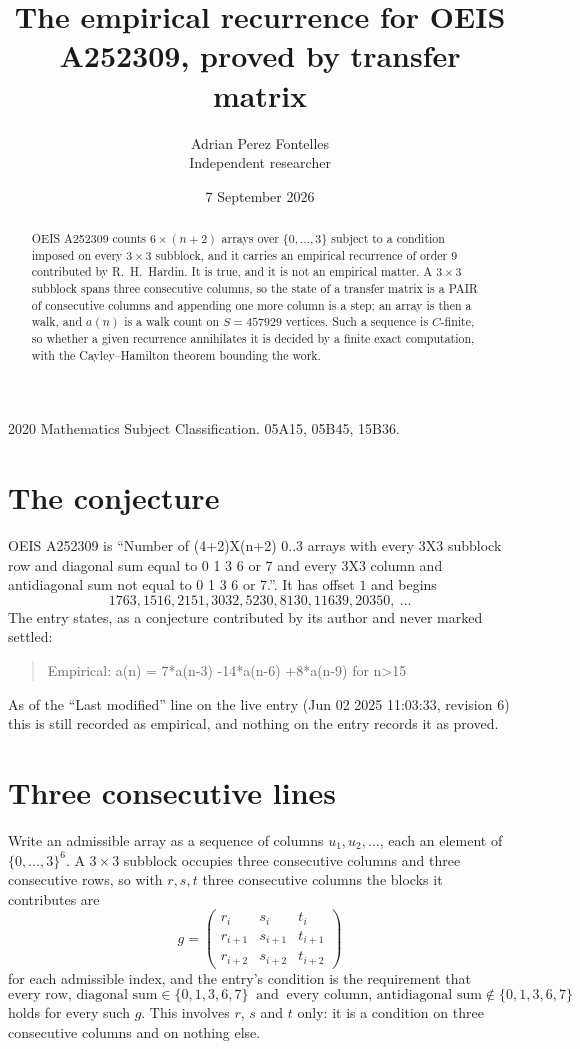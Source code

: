 \documentclass[11pt,a4paper]{article}
\title{The empirical recurrence for OEIS A252309, proved by transfer matrix}
\author{Adrian Perez Fontelles\\ \small Independent researcher}
\date{7 September 2026}
\theoremstyle{plain}
\theoremstyle{definition}
\begin{document}
\maketitle

\begin{abstract}
OEIS A252309 counts $6\times(n+2)$ arrays over $\{0,\dots,3\}$ subject to a condition imposed on
every $3\times3$ subblock, and it carries an empirical recurrence of order $9$
contributed by R.~H.~Hardin. It is true, and it is not an empirical matter. A $3\times3$
subblock spans three consecutive columns, so the state of a transfer matrix is a PAIR of
consecutive columns and appending one more column is a step; an array is then a walk, and
$a(n)$ is a walk count on $S=457929$ vertices. Such a sequence is $C$-finite, so whether a given
recurrence annihilates it is decided by a finite exact computation, with the Cayley--Hamilton
theorem bounding the work.
\end{abstract}

\noindent\small 2020 Mathematics Subject Classification. 05A15, 05B45, 15B36.\normalsize

\section{The conjecture}

OEIS A252309 is ``Number of (4+2)X(n+2) 0..3 arrays with every 3X3 subblock row and diagonal sum equal to 0 1 3 6 or 7 and every 3X3 column and antidiagonal sum not equal to 0 1 3 6 or 7.''. It has offset $1$ and begins
\[
1763, 1516, 2151, 3032, 5230, 8130, 11639, 20350,\ \dots
\]
The entry states, as a conjecture contributed by its author and never marked settled:
\begin{quote}
Empirical: a(n) = 7*a(n-3) -14*a(n-6) +8*a(n-9) for n>15
\end{quote}
As of the ``Last modified'' line on the live entry (Jun 02 2025 11:03:33, revision 6) this is still
recorded as empirical, and nothing on the entry records it as proved.

\section{Three consecutive lines}

Write an admissible array as a sequence of columns $u_1,u_2,\dots$, each an element of
$\{0,\dots,3\}^{6}$. A $3\times3$ subblock occupies three consecutive columns and
three consecutive rows, so with $r,s,t$ three consecutive columns the blocks it
contributes are
\[
g=\begin{pmatrix}r_i&s_i&t_i\\ r_{i+1}&s_{i+1}&t_{i+1}\\ r_{i+2}&s_{i+2}&t_{i+2}\end{pmatrix}
\]
for each admissible index, and the entry's condition is the requirement that
\[
\text{every row, diagonal sum} \in \{0,1,3,6,7\}\ \text{ and }\ \text{every column, antidiagonal sum} \notin \{0,1,3,6,7\}
\]
holds for every such $g$. This involves $r$, $s$ and $t$ only: it is a condition on
three consecutive columns and on nothing else.
\end{document}
